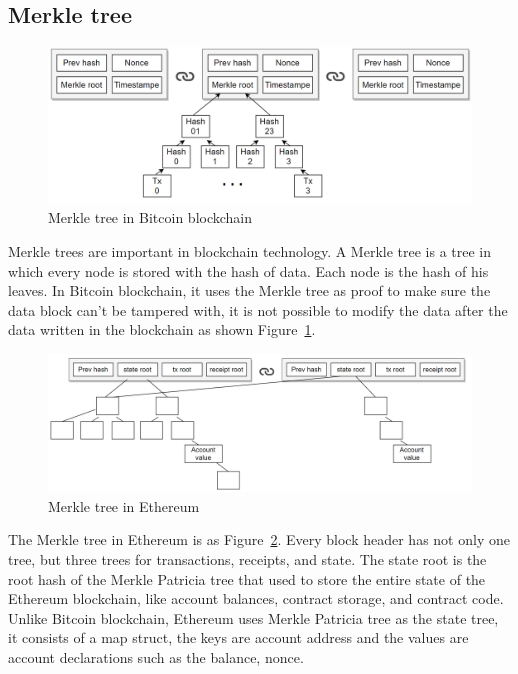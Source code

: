     \subsection{Merkle tree}
    \begin{figure}[hb]
        \centering
        \includegraphics[height=!,width=1\linewidth,keepaspectratio=true]{figures/merkle_tree_in_BC.png}
        \caption{{\footnotesize Merkle tree in Bitcoin blockchain}}
        \label{fig:merkleTreeInBC}
    \end{figure}
    Merkle trees are important in blockchain technology. A Merkle tree is a tree in which every node is stored with the hash of data. Each node is the hash of his leaves. In Bitcoin blockchain, it uses the Merkle tree as proof to make sure the data block can't be tampered with, it is not possible to modify the data after the data written in the blockchain as shown Figure~\ref{fig:merkleTreeInBC}.\par
    \begin{figure}[htb]
        \centering
        \includegraphics[height=!,width=1\linewidth,keepaspectratio=true]{figures/merkle_tree_in_Eth.png}
        \caption{{\footnotesize Merkle tree in Ethereum}}
        \label{fig:merkleTreeInEth}
    \end{figure}
    The Merkle tree in Ethereum is as Figure~\ref{fig:merkleTreeInEth}. Every block header has not only one tree, but three trees for transactions, receipts, and state. The state root is the root hash of the Merkle Patricia tree that used to store the entire state of the Ethereum blockchain, like account balances, contract storage, and contract code. Unlike Bitcoin blockchain, Ethereum uses Merkle Patricia tree as the state tree, it consists of a map struct, the keys are account address and the values are account declarations such as the balance, nonce.

